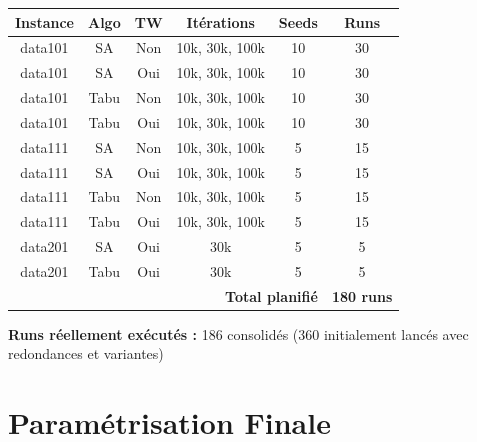 \documentclass[12pt,a4paper,twoside]{report}
\begin{document}
\begin{longtable}{|c|c|c|c|c|c|}
    \hline
    \textbf{Instance}                             & \textbf{Algo}     & \textbf{TW} & \textbf{Itérations} & \textbf{Seeds} & \textbf{Runs} \\
    \hline
    \endhead
    data101                                       & SA                & Non         & 10k, 30k, 100k      & 10             & 30            \\
    data101                                       & SA                & Oui         & 10k, 30k, 100k      & 10             & 30            \\
    data101                                       & Tabu              & Non         & 10k, 30k, 100k      & 10             & 30            \\
    data101                                       & Tabu              & Oui         & 10k, 30k, 100k      & 10             & 30            \\
    data111                                       & SA                & Non         & 10k, 30k, 100k      & 5              & 15            \\
    data111                                       & SA                & Oui         & 10k, 30k, 100k      & 5              & 15            \\
    data111                                       & Tabu              & Non         & 10k, 30k, 100k      & 5              & 15            \\
    data111                                       & Tabu              & Oui         & 10k, 30k, 100k      & 5              & 15            \\
    data201                                       & SA                & Oui         & 30k                 & 5              & 5             \\
    data201                                       & Tabu              & Oui         & 30k                 & 5              & 5             \\
    \hline
    \multicolumn{5}{|r|}{\textbf{Total planifié}} & \textbf{180 runs}                                                                      \\
    \hline
\end{longtable}

\textbf{Runs réellement exécutés :} 186 consolidés (360 initialement lancés avec redondances et variantes)

\section{Paramétrisation Finale}
\end{document}
